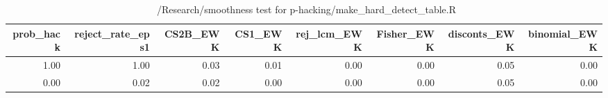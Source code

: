 \begin{table}[ht]
\centering
\begin{tabular}{rrrrrrrr}
  \hline
prob\_hack & reject\_rate\_eps1 & CS2B\_EWK & CS1\_EWK & rej\_lcm\_EWK & Fisher\_EWK & disconts\_EWK & binomial\_EWK \\ 
  \hline
1.00 & 1.00 & 0.03 & 0.01 & 0.00 & 0.00 & 0.05 & 0.00 \\ 
  0.00 & 0.02 & 0.02 & 0.00 & 0.00 & 0.00 & 0.05 & 0.00 \\ 
   \hline
\end{tabular}
\caption{~/Research/smoothness test for p-hacking/make_hard_detect_table.R} 
\label{tab:hard_detect}
\end{table}
